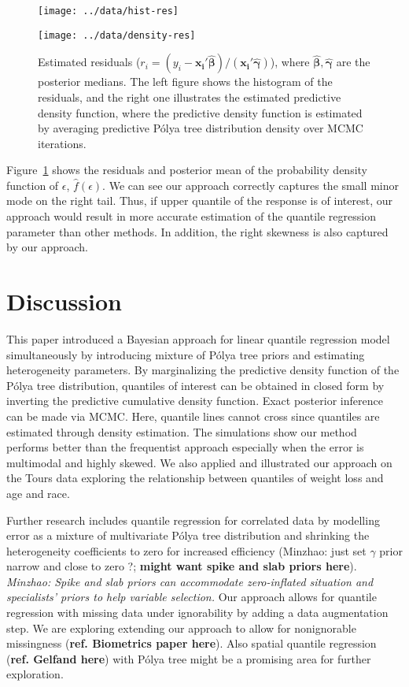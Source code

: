 \documentclass[12pt]{article}
\newcommand{\polya}{P\'{o}lya}
\begin{document}
\begin{figure}[htbp]
  \begin{minipage}{0.5\linewidth}
    \centerline{\texttt{[image: ../data/hist-res]}}
  \end{minipage}
  \begin{minipage}{0.5\linewidth}
    \centerline{\texttt{[image: ../data/density-res]}}
  \end{minipage}
  \caption[]{\label{fig:tourpost} Estimated residuals ($r_i = (y_i-
    \bm{x_i'\hat{\beta}})/(\bm{x_i'\hat{\gamma}})$), where
    $\hat{\bm{\beta}}, \hat{\bm{\gamma}}$ are the posterior medians. The left
    figure shows the histogram of the residuals, and the right one
    illustrates the estimated predictive density function, where the
    predictive density function is estimated by averaging predictive
    \polya{} tree distribution density over MCMC iterations.} 
\end{figure}

Figure~\ref{fig:tourpost} shows the residuals and posterior mean of the
probability density function of $\epsilon$, $\hat{f}(\epsilon)$. We
can see our approach correctly captures the small minor mode on
the right tail. Thus, if upper quantile of the response is of interest, our
approach would result in more accurate estimation of the quantile regression
parameter than other methods. In addition, the right skewness is also
captured by our approach.

\section{Discussion}
This paper introduced a Bayesian approach for linear quantile regression
model simultaneously by introducing mixture of \polya{} tree
priors and estimating heterogeneity parameters. By marginalizing the
predictive density function of the \polya{} tree distribution, quantiles
of interest can be obtained in closed form by inverting the predictive cumulative
density function. Exact posterior inference can be made via
MCMC. Here, quantile lines cannot cross since 
quantiles are estimated through density estimation. 
The simulations show our method performs better than the frequentist
approach especially when the error is multimodal and highly skewed. We
also applied and illustrated our approach on the Tours data exploring
the relationship between  quantiles of weight loss and age
and race. 

Further research includes quantile regression for correlated data by
modelling error as a mixture of multivariate \polya{} tree
distribution and 
shrinking the heterogeneity coefficients to zero for increased
efficiency  (Minzhao: just set
$\gamma$ prior narrow and  close to zero ?; {\bf might want spike and
  slab priors here}). {\it Minzhao: Spike and slab
priors can accommodate zero-inflated situation and specialists' priors
to help variable selection.} Our approach allows for
quantile
regression with missing data under ignorability by adding a data
augmentation step.  We are exploring extending our approach to allow
for nonignorable missingness ({\bf ref. Biometrics paper here}).
Also spatial quantile regression ({\bf ref. Gelfand here}) with \polya{} tree might be
a promising area for further exploration. 
\end{document}
